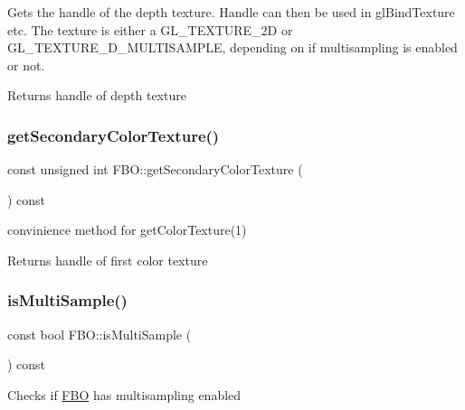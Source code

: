 Gets the handle of the depth texture. Handle can then be used in gl\+Bind\+Texture etc. The texture is either a G\+L\+\_\+\+T\+E\+X\+T\+U\+R\+E\+\_\+2D or G\+L\+\_\+\+T\+E\+X\+T\+U\+R\+E\+\_\+D\+\_\+\+M\+U\+L\+T\+I\+S\+A\+M\+P\+LE, depending on if multisampling is enabled or not.

\begin{DoxyReturn}{Returns}
handle of depth texture 
\end{DoxyReturn}
\mbox{\label{class_f_b_o_a12cf770f6b67937a89b13cdeb5d5aeb1}} 
\subsubsection{\texorpdfstring{getSecondaryColorTexture()}{getSecondaryColorTexture()}}
{\footnotesize\ttfamily const unsigned int F\+B\+O\+::get\+Secondary\+Color\+Texture (\begin{DoxyParamCaption}{ }\end{DoxyParamCaption}) const\hspace{0.3cm}{\ttfamily [inline]}}

convinience method for get\+Color\+Texture(1)

\begin{DoxyReturn}{Returns}
handle of first color texture 
\end{DoxyReturn}
\mbox{\label{class_f_b_o_a0d20c728cb85513791a853695ee527a6}} 
\subsubsection{\texorpdfstring{isMultiSample()}{isMultiSample()}}
{\footnotesize\ttfamily const bool F\+B\+O\+::is\+Multi\+Sample (\begin{DoxyParamCaption}{ }\end{DoxyParamCaption}) const\hspace{0.3cm}{\ttfamily [inline]}}

Checks if \mbox{\hyperlink{class_f_b_o}{F\+BO}} has multisampling enabled \mbox{\label{class_f_b_o_a0372e62761da8e6e073c8c05b9dfb8f7}} 
